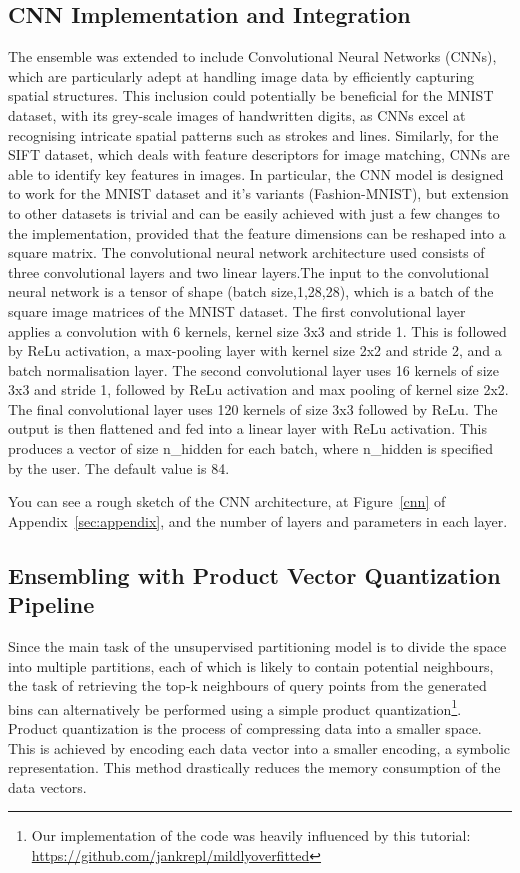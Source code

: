 \documentclass[sigconf, nonacm]{acmart}
\begin{document}
\subsection{CNN Implementation and Integration}

The ensemble was extended to include Convolutional Neural Networks (CNNs), which are particularly adept at handling image data by efficiently capturing spatial structures\cite{cnn}. This inclusion could potentially be beneficial for the MNIST dataset, with its grey-scale images of handwritten digits, as CNNs excel at recognising intricate spatial patterns such as strokes and lines. Similarly, for the SIFT dataset, which deals with feature descriptors for image matching, CNNs are able to identify key features in images. In particular, the CNN model is designed to work for the MNIST dataset and it's variants (Fashion-MNIST), but extension to other datasets is trivial and can be easily achieved with just a few changes to the implementation, provided that the feature dimensions can be reshaped into a square matrix. The convolutional neural network architecture used consists of three convolutional layers and two linear layers.The input to the convolutional neural network is a tensor of shape (batch size,1,28,28), which is a batch of the square image matrices of the MNIST dataset. The first convolutional layer applies a convolution with 6 kernels, kernel size 3x3 and stride 1. This is followed by ReLu activation, a max-pooling layer with kernel size 2x2 and stride 2, and a batch normalisation layer. The second convolutional layer uses 16 kernels of size 3x3 and stride 1, followed by ReLu activation and max pooling of kernel size 2x2. The final convolutional layer uses 120 kernels of size 3x3 followed by ReLu. The output is then flattened and fed into a linear layer with ReLu activation. This produces a vector of size n\_hidden for each batch, where n\_hidden is specified by the user. The default value is 84.

You can see a rough sketch of the CNN architecture, at Figure~\ref{cnn} of Appendix~\ref{sec:appendix}, and the number of layers and parameters in each layer.

\subsection{Ensembling with Product Vector Quantization Pipeline}

Since the main task of the unsupervised partitioning model is to divide the space into multiple partitions, each of which is likely to contain potential neighbours, the task of retrieving the top-k neighbours of query points from the generated bins can alternatively be performed using a simple product quantization\footnote{Our implementation of the code was heavily influenced by this tutorial: \url{https://github.com/jankrepl/mildlyoverfitted}}. Product quantization \cite{pquantize} is the process of compressing data into a smaller space. This is achieved by encoding each data vector into a smaller encoding, a symbolic representation. This method drastically reduces the memory consumption of the data vectors.
\end{document}
